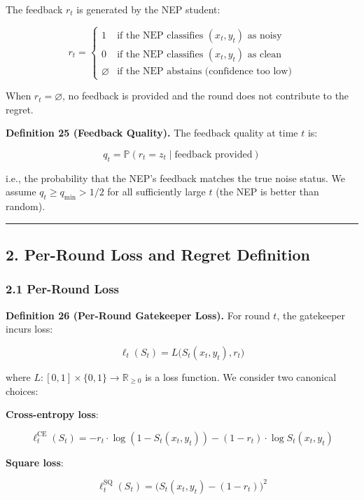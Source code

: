 \documentclass[
  12pt,
]{article}
\begin{document}
The feedback \(r_t\) is generated by the NEP student:

\[r_t = \begin{cases}
1 & \text{if the NEP classifies } (x_t, y_t) \text{ as noisy} \\
0 & \text{if the NEP classifies } (x_t, y_t) \text{ as clean} \\
\varnothing & \text{if the NEP abstains (confidence too low)}
\end{cases}\]

When \(r_t = \varnothing\), no feedback is provided and the round does
not contribute to the regret.

\textbf{Definition 25 (Feedback Quality).} The feedback quality at time
\(t\) is:

\[q_t = \mathbb{P}(r_t = z_t \mid \text{feedback provided})\]

i.e., the probability that the NEP's feedback matches the true noise
status. We assume \(q_t \geq q_{\min} > 1/2\) for all sufficiently large
\(t\) (the NEP is better than random).

\begin{center}\rule{0.5\linewidth}{0.5pt}\end{center}

\subsection{2. Per-Round Loss and Regret
Definition}\label{per-round-loss-and-regret-definition}

\subsubsection{2.1 Per-Round Loss}\label{per-round-loss}

\textbf{Definition 26 (Per-Round Gatekeeper Loss).} For round \(t\), the
gatekeeper incurs loss:

\[\ell_t(S_t) = L\bigl(S_t(x_t, y_t), r_t\bigr)\]

where \(L: [0,1] \times \{0,1\} \to \mathbb{R}_{\geq 0}\) is a loss
function. We consider two canonical choices:

\textbf{Cross-entropy loss}:

\[\ell_t^{\text{CE}}(S_t) = -r_t \cdot \log(1 - S_t(x_t, y_t)) - (1-r_t) \cdot \log S_t(x_t, y_t)\]

\textbf{Square loss}:

\[\ell_t^{\text{SQ}}(S_t) = \bigl( S_t(x_t, y_t) - (1 - r_t) \bigr)^2\]
\end{document}
